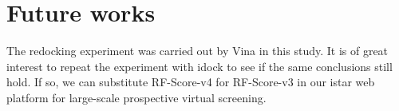 \section{Future works}

The redocking experiment was carried out by Vina in this study. It is of great interest to repeat the experiment with idock to see if the same conclusions still hold. If so, we can substitute RF-Score-v4 for RF-Score-v3 in our istar web platform for large-scale prospective virtual screening.

\chapterend
